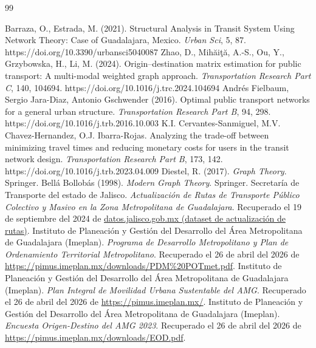 \begin{thebibliography}{99}
{}

     Barraza, O., Estrada, M. (2021). Structural Analysis in Transit System Using Network Theory: Case of Guadalajara, Mexico. \textit{Urban Sci}, 5, 87. https://doi.org/10.3390/urbansci5040087
     Zhao, D., Mihăiţă, A.-S., Ou, Y., Grzybowska, H., Li, M. (2024). Origin–destination matrix estimation for public transport: A multi-modal weighted graph approach. \textit{Transportation Research Part C}, 140, 104694. https://doi.org/10.1016/j.trc.2024.104694
     Andrés Fielbaum, Sergio Jara-Diaz, Antonio Gschwender (2016). Optimal public transport networks for a general urban structure. \textit{Transportation Research Part B}, 94, 298.
    https://doi.org/10.1016/j.trb.2016.10.003
     K.I. Cervantes-Sanmiguel, M.V. Chavez-Hernandez, O.J. Ibarra-Rojas. Analyzing the trade-off between minimizing travel times and reducing monetary costs for users in the transit network design. \textit{Transportation Research Part B}, 173, 142.
    https://doi.org/10.1016/j.trb.2023.04.009
     Diestel, R. (2017). \textit{Graph Theory}. Springer.
     Bellá Bollobás (1998). \textit{Modern Graph Theory}. Springer.
     Secretaría de Transporte del estado de Jalisco. \textit{Actualización de Rutas de Transporte Público Colectivo y Masivo en la Zona Metropolitana de Guadalajara}. Recuperado el 19 de septiembre del 2024 de \href{https://datos.jalisco.gob.mx/dataset/actualizacion-de-rutas-de-transporte-publico-colectivo-y-masivo-en-la-zona-metropolitana-de}{datos.jalisco.gob.mx (dataset de actualización de rutas)}.
     Instituto de Planeación y Gestión del Desarrollo del Área Metropolitana de Guadalajara (Imeplan). \textit{Programa de Desarrollo Metropolitano y Plan de Ordenamiento Territorial Metropolitano}. Recuperado el 26 de abril del 2026 de \url{https://pimus.imeplan.mx/downloads/PDM%20POTmet.pdf}.
     Instituto de Planeación y Gestión del Desarrollo del Área Metropolitana de Guadalajara (Imeplan). \textit{Plan Integral de Movilidad Urbana Sustentable del AMG}. Recuperado el 26 de abril del 2026 de \url{https://pimus.imeplan.mx/}.
     Instituto de Planeación y Gestión del Desarrollo del Área Metropolitana de Guadalajara (Imeplan). \textit{Encuesta Origen-Destino del AMG 2023}. Recuperado el 26 de abril del 2026 de \url{https://pimus.imeplan.mx/downloads/EOD.pdf}.

\end{thebibliography}
